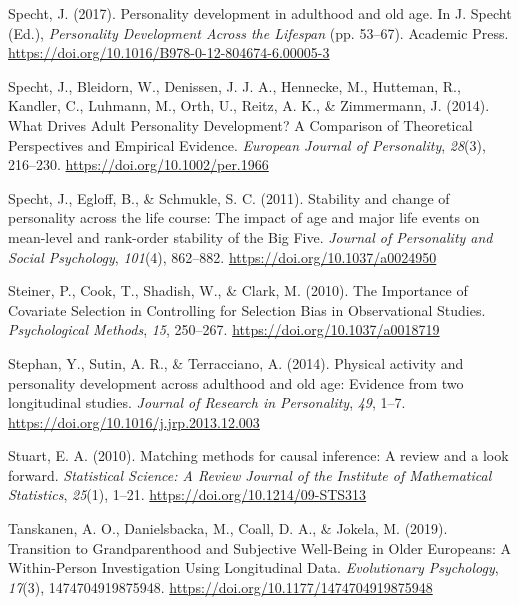 \documentclass[
  english,
  man, noextraspace]{apa7}
\begin{document}
\leavevmode\hypertarget{ref-spechtPersonalityDevelopmentAdulthood2017}{}%
Specht, J. (2017). Personality development in adulthood and old age. In J. Specht (Ed.), \emph{Personality Development Across the Lifespan} (pp. 53--67). Academic Press. \url{https://doi.org/10.1016/B978-0-12-804674-6.00005-3}

\leavevmode\hypertarget{ref-spechtWhatDrivesAdult2014}{}%
Specht, J., Bleidorn, W., Denissen, J. J. A., Hennecke, M., Hutteman, R., Kandler, C., Luhmann, M., Orth, U., Reitz, A. K., \& Zimmermann, J. (2014). What Drives Adult Personality Development? A Comparison of Theoretical Perspectives and Empirical Evidence. \emph{European Journal of Personality}, \emph{28}(3), 216--230. \url{https://doi.org/10.1002/per.1966}

\leavevmode\hypertarget{ref-spechtStabilityChangePersonality2011}{}%
Specht, J., Egloff, B., \& Schmukle, S. C. (2011). Stability and change of personality across the life course: The impact of age and major life events on mean-level and rank-order stability of the Big Five. \emph{Journal of Personality and Social Psychology}, \emph{101}(4), 862--882. \url{https://doi.org/10.1037/a0024950}

\leavevmode\hypertarget{ref-steinerImportanceCovariateSelection2010}{}%
Steiner, P., Cook, T., Shadish, W., \& Clark, M. (2010). The Importance of Covariate Selection in Controlling for Selection Bias in Observational Studies. \emph{Psychological Methods}, \emph{15}, 250--267. \url{https://doi.org/10.1037/a0018719}

\leavevmode\hypertarget{ref-stephanPhysicalActivityPersonality2014}{}%
Stephan, Y., Sutin, A. R., \& Terracciano, A. (2014). Physical activity and personality development across adulthood and old age: Evidence from two longitudinal studies. \emph{Journal of Research in Personality}, \emph{49}, 1--7. \url{https://doi.org/10.1016/j.jrp.2013.12.003}

\leavevmode\hypertarget{ref-stuartMatchingMethodsCausal2010}{}%
Stuart, E. A. (2010). Matching methods for causal inference: A review and a look forward. \emph{Statistical Science: A Review Journal of the Institute of Mathematical Statistics}, \emph{25}(1), 1--21. \url{https://doi.org/10.1214/09-STS313}

\leavevmode\hypertarget{ref-tanskanenTransitionGrandparenthoodSubjective2019}{}%
Tanskanen, A. O., Danielsbacka, M., Coall, D. A., \& Jokela, M. (2019). Transition to Grandparenthood and Subjective Well-Being in Older Europeans: A Within-Person Investigation Using Longitudinal Data. \emph{Evolutionary Psychology}, \emph{17}(3), 1474704919875948. \url{https://doi.org/10.1177/1474704919875948}
\end{document}
